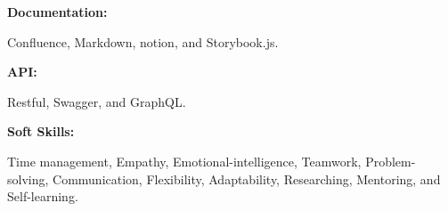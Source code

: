 \documentclass[9pt]{developercv} %
\begin{document}
\begin{minipage}[t]{0.465\textwidth}
        \begin{minipage}[t]{0.3\textwidth}
            \textbf{Documentation:}
        \end{minipage}
        \hfill
        \begin{minipage}[t]{0.73\textwidth}
            Confluence, Markdown, notion, and Storybook.js.
        \end{minipage}
        \vspace{4mm}

        \begin{minipage}[t]{0.2\textwidth}
            \textbf{API:}
        \end{minipage}
        \hfill
        \begin{minipage}[t]{0.73\textwidth}
            Restful, Swagger, and GraphQL.
        \end{minipage}
        \vspace{4mm}

        \begin{minipage}[t]{0.2\textwidth}
            \textbf{Soft Skills:}
        \end{minipage}
        \hfill
        \begin{minipage}[t]{0.73\textwidth}
            Time management, Empathy, Emotional-intelligence, Teamwork, Problem-solving, Communication, Flexibility, Adaptability, Researching, Mentoring, and Self-learning.
        \end{minipage}

    \end{minipage}
\end{document}
